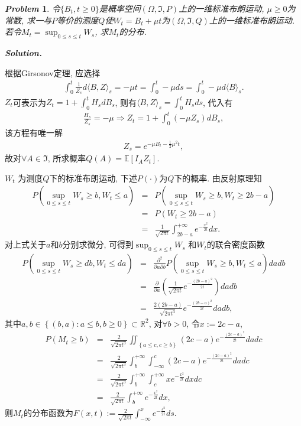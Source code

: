 \documentclass{article}
\newtheorem{problem}{\itshape Problem}
\newtheorem*{Solution}{\itshape Solution}
\renewenvironment{Solution}[1][\itshape Solution.]{%
  \par\noindent\textbf{#1}\quad\CJKfamily{SimSun}%
}{\par}
\begin{document}
\begin{problem}
令$\{B_t,t\ge 0\}$是概率空间$(\Omega, \mathfrak{I}, P)$上的一维标准布朗运动, $\mu\ge 0$为常数, 求一与$P$等价的测度$Q$使$W_t = B_t + \mu t$为$(\Omega, \mathfrak{I}, Q)$上的一维标准布朗运动. 若令$M_t = \sup_{0\le s \le t} W_s$, 求$M_t$的分布.
\end{problem}

\begin{Solution}
   
  根据Girsonov定理, 应选择
  \begin{eqnarray*}
    \int_0^t \frac{1}{Z_s} d\langle B,Z\rangle_s = -\mu t =  \int_0^t-\mu ds= \int_0^t -\mu d\langle B\rangle_s.
  \end{eqnarray*} 
  $Z_t$可表示为$Z_t = 1 + \int_0^t H_s dB_s$, 则有$\langle B,Z\rangle_s = \int_0^t H_s ds$, 代入有
  \begin{eqnarray*}
    \frac{H_s}{Z_s} =- \mu \Longrightarrow Z_t = 1 +\int _0^t \left(-\mu Z_s\right) dB_s,
  \end{eqnarray*}
该方程有唯一解
\begin{eqnarray*}
  Z_s = e^{-\mu B_t - \frac{1}{2}\mu^2t},
\end{eqnarray*}
故对$\forall A \in \mathfrak{I}$, 所求概率$Q(A) = \mathbb{E}\left[I_AZ_t\right]$.

$W_t$ 为测度$Q$下的标准布朗运动, 下述$P(\cdot)$为$Q$下的概率. 由反射原理知
\begin{eqnarray*}
  P\left(\sup_{0\le s\le t} W_s \ge b, W_t \le a\right) &=&  P\left(\sup_{0\le s\le t} W_s \ge b, W_t \ge 2b -a\right) \\
  &=& P\left(W_t \ge 2b-a\right) \\
  &=& \frac{1}{\sqrt{2\pi t}} \int_{2b-a}
^{+\infty} e^{-\frac{x^2}{2t}}dx.
\end{eqnarray*}
对上式关于$a$和$b$分别求微分, 可得到$\sup_{0\le s\le t} W_s$ 和$ W_t$的联合密度函数
\begin{eqnarray*}
  P\left(\sup_{0\le s\le t} W_s \ge db, W_t \le da\right) &=&  \frac{\partial^2}{\partial a \partial b}P\left(\sup_{0\le s\le t} W_s \ge b, W_t \le a\right)dadb\\
  &=& \frac{\partial}{\partial a} \left(\frac{1}{\sqrt{2\pi t}} e^{-\frac{(2b-a)^2}{2t}}\right)dadb\\
  &=& \frac{2(2b-a)}{\sqrt{2\pi t^3}} e^{-\frac{(2b-a)^2}{2t}}dadb,
\end{eqnarray*}
其中$a,b\in\left\{(b,a):a\le b, b\ge 0\right\} \subset\mathbb{R}^2$, 对$\forall b>0$, 令$x:= 2c-a$,
\begin{eqnarray*}
  P\left(M_t \ge b\right) &=&  \frac{2}{\sqrt{2\pi t^3}} \iint_{\left\{a\le c, c\ge b\right\}} (2c-a) e^{-\frac{(2c-a)^2}{2t}}dadc\\
  &=&  \frac{2}{\sqrt{2\pi t^3}} \int_b^{+\infty }\int_{-\infty}^c (2c-a) e^{-\frac{(2c-a)^2}{2t}}dadc\\
  &=&  \frac{2}{\sqrt{2\pi t^3}} \int_b^{+\infty }\int^{+\infty}_c x e^{-\frac{x^2}{2t}}dxdc\\
  &=&  \frac{2}{\sqrt{2\pi t}}  \int_b^{+\infty } e^{-\frac{x^2}{2t}}dx,
\end{eqnarray*}
则$M_t$的分布函数为$F(x,t) := \frac{2}{\sqrt{2\pi t}}  \int^x_{-\infty } e^{-\frac{s^2}{2t}}ds$.
\end{Solution}
\end{document}
